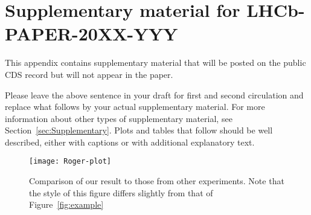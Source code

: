 \clearpage

\section{Supplementary material for LHCb-PAPER-20XX-YYY}
\label{sec:Supplementary-App}

This appendix contains supplementary material that will be posted
on the public CDS record but will not appear in the paper.

Please leave the above sentence in your draft for first and 
second circulation and replace what follows by your actual supplementary material.
For more information about other types of supplementary material, see Section~\ref{sec:Supplementary}. Plots and tables that follow should be well described, either with captions or with additional explanatory text.


\begin{figure}[!htb]
  \begin{center}
    \texttt{[image: Roger-plot]}
    \vspace*{-1.0cm}
  \end{center}
  \caption{
    \small %
    Comparison of our result to those from other experiments.
    Note that the style of this figure differs slightly from that of Figure~\ref{fig:example}}
  \label{fig:roger}
\end{figure}

\clearpage
